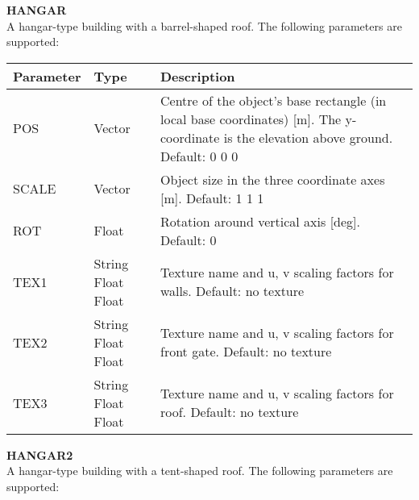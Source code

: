 \documentclass[Orbiter Developer Manual.tex]{subfiles}
\begin{document}
\noindent
\textbf{HANGAR}\\
A hangar-type building with a barrel-shaped roof. The following parameters are supported:

	\begin{longtable}{ |p{}|p{}|p{}| }
	\hline\rule{0pt}{2ex}
	\textbf{Parameter} & \textbf{Type} & \textbf{Description}\\
	\hline\rule{0pt}{2ex}
	POS & Vector & Centre of the object's base rectangle (in local base coordinates) [m]. The y-coordinate is the elevation above ground. Default: 0 0 0\\
	\hline\rule{0pt}{2ex}
	SCALE & Vector & Object size in the three coordinate axes [m]. Default: 1 1 1\\
	\hline\rule{0pt}{2ex}
	ROT & Float & Rotation around vertical axis [deg]. Default: 0\\
	\hline\rule{0pt}{2ex}
	TEX1 & String Float Float & Texture name and u, v scaling factors for walls. Default: no texture\\
	\hline\rule{0pt}{2ex}
	TEX2 & String Float Float & Texture name and u, v scaling factors for front gate. Default: no texture\\
	\hline\rule{0pt}{2ex}
	TEX3 & String Float Float & Texture name and u, v scaling factors for roof. Default: no texture\\
	\hline
	\end{longtable}

\noindent
\textbf{HANGAR2}\\
A hangar-type building with a tent-shaped roof. The following parameters are supported:
\end{document}
